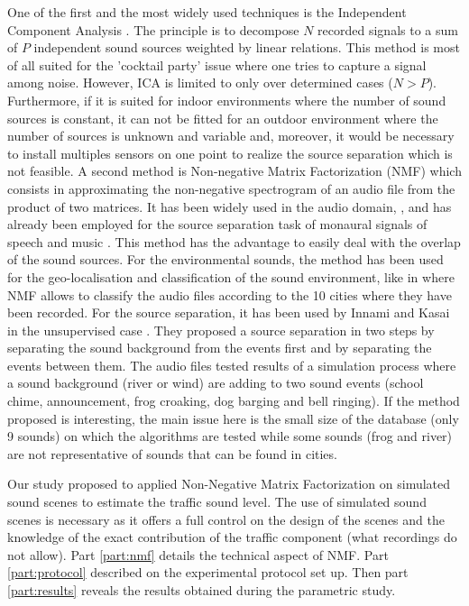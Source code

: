 \documentclass[twocolumn,a4paper,10pt]{article}
\begin{document}
One of the first and the most widely used techniques is the Independent Component Analysis \cite{comon_independent_1994}. The principle is to decompose $N$ recorded signals to a sum of $P$ independent sound sources weighted by linear relations. This method is most of all suited for the 'cocktail party' issue where one tries to capture a signal among noise.  However, ICA is limited to only over determined cases ($N > P$). Furthermore, if it is suited for indoor environments where the number of sound sources is constant, it can not be fitted for an outdoor environment where the number of sources is unknown and variable and, moreover, it would be necessary to install multiples sensors on one point to realize the source separation which is not feasible. A second method is Non-negative Matrix Factorization (NMF) \cite{lee_learning_1999} which consists in approximating the non-negative spectrogram of an audio file from the product of two matrices. It has been widely used in the audio domain, \cite{smaragdis_non-negative_2003} \cite{wilson_speech_2008} \cite{mesaros_sound_2015}, and has already been employed for the source separation task of monaural signals of speech and music \cite{wang_musical_2005} \cite{wilson_speech_2008}. This method has the advantage to easily deal with the overlap of the sound sources. For the environmental sounds, the method has been used for the geo-localisation and classification of the sound environment, like in \cite{kumar_audio_2016} where NMF allows to classify the audio files according to the 10 cities where they have been recorded. For the source separation, it has been used by Innami and Kasai in the unsupervised case \cite{satoshi_innami_nmf-based_2012}. They proposed a source separation in two steps by separating the sound background from the events first and by separating the events between them. The audio files tested results of a simulation process where a sound background (river or wind) are adding to two sound events (school chime, announcement, frog croaking, dog barging and bell ringing). If the method proposed is interesting, the main issue here is the small size of the database (only 9 sounds) on which the algorithms are tested while some sounds (frog and river) are not representative of sounds that can be found in cities.

Our study proposed to applied Non-Negative Matrix Factorization on simulated sound scenes to estimate the traffic sound level. The use of simulated sound scenes is necessary as it offers a full control on the design of the scenes and the knowledge of the exact contribution of the traffic component (what recordings do not allow). Part \ref{part:nmf} details the technical aspect of NMF. Part \ref{part:protocol} described on the experimental protocol set up. Then part \ref{part:results} reveals the results obtained during the parametric study. 
\end{document}
